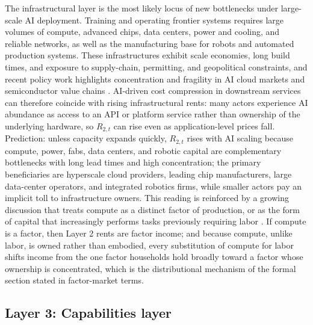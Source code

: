 \documentclass[11pt]{article}
\begin{document}
The infrastructural layer is the most likely locus of new bottlenecks under large-scale AI deployment. Training and operating frontier systems requires large volumes of compute, advanced chips, data centers, power and cooling, and reliable networks, as well as the manufacturing base for robots and automated production systems. These infrastructures exhibit scale economies, long build times, and exposure to supply-chain, permitting, and geopolitical constraints, and recent policy work highlights concentration and fragility in AI cloud markets and semiconductor value chains \citep{OECD2024AIData,OECD2025AIInfra}. AI-driven cost compression in downstream services can therefore coincide with rising infrastructural rents: many actors experience AI abundance as access to an API or platform service rather than ownership of the underlying hardware, so \(R_{2,t}\) can rise even as application-level prices fall. Prediction: unless capacity expands quickly, \(R_{2,t}\) rises with AI scaling because compute, power, fabs, data centers, and robotic capital are complementary bottlenecks with long lead times and high concentration; the primary beneficiaries are hyperscale cloud providers, leading chip manufacturers, large data-center operators, and integrated robotics firms, while smaller actors pay an implicit toll to infrastructure owners. This reading is reinforced by a growing discussion that treats compute as a distinct factor of production, or as the form of capital that increasingly performs tasks previously requiring labor \citep{AghionJonesJones2019, Sastry2024ComputeGovernance}. If compute is a factor, then Layer 2 rents are factor income; and because compute, unlike labor, is owned rather than embodied, every substitution of compute for labor shifts income from the one factor households hold broadly toward a factor whose ownership is concentrated, which is the distributional mechanism of the formal section stated in factor-market terms.

\subsection{Layer 3: Capabilities layer}
\end{document}
